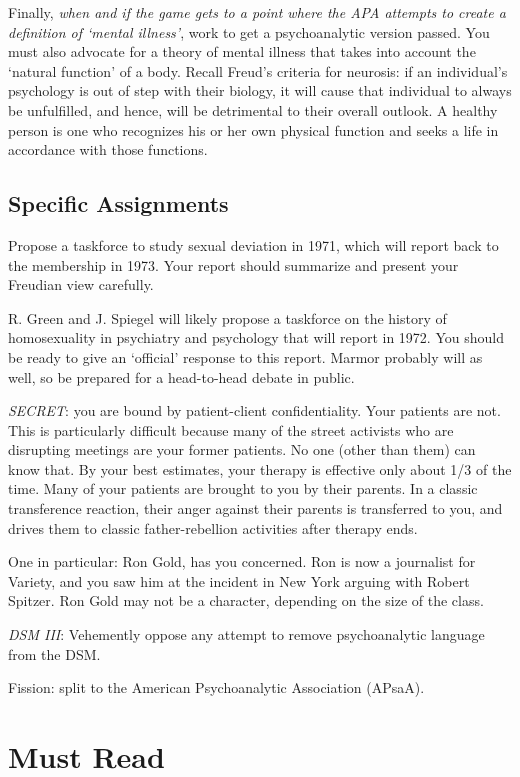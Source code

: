 Finally, \emph{when and if the game gets to a point where the APA attempts to create a definition of `mental illness'}, work to get a psychoanalytic version passed. You must also advocate for a theory of mental illness that takes into account the `natural function' of a body. Recall Freud's criteria for neurosis: if an individual's psychology is out of step with their biology, it will cause that individual to always be unfulfilled, and hence, will be detrimental to their overall outlook. A healthy person is one who recognizes his or her own physical function and seeks a life in accordance with those functions.

\subsection{Specific Assignments}
\label{specificassignments}

Propose a taskforce to study sexual deviation in 1971, which will report back to the membership in 1973. Your report should summarize and present your Freudian view carefully.

R. Green and J. Spiegel will likely propose a taskforce on the history of homosexuality in psychiatry and psychology that will report in 1972. You should be ready to give an `official' response to this report. Marmor probably will as well, so be prepared for a head-to-head debate in public.

\emph{SECRET}: you are bound by patient-client confidentiality. Your patients are not. This is particularly difficult because many of the street activists who are disrupting meetings are your former patients. No one (other than them) can know that. By your best estimates, your therapy is effective only about 1\slash 3 of the time. Many of your patients are brought to you by their parents. In a classic transference reaction, their anger against their parents is transferred to you, and drives them to classic father-rebellion activities after therapy ends. 

One in particular: Ron Gold, has you concerned. Ron is now a journalist for Variety, and you saw him at the incident in New York arguing with Robert Spitzer. Ron Gold may not be a character, depending on the size of the class.

\emph{DSM III}: Vehemently oppose any attempt to remove psychoanalytic language from the DSM.

Fission: split to the American Psychoanalytic Association (APsaA).

\section{Must Read}
\label{mustread}


